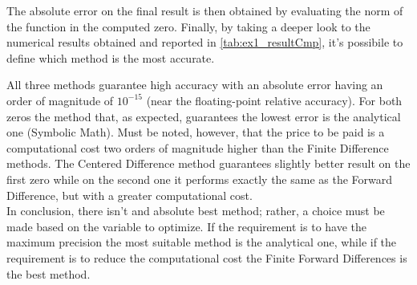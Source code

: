 \documentclass[11pt,a4paper,oneside]{article}
\begin{document}
The absolute error on the final result is then obtained by evaluating the norm of the function in the computed zero. 
Finally, by taking a deeper look to the numerical results obtained and reported in \cref{tab:ex1_resultCmp}, it's possibile to define which method is the most accurate.

\begin{table}[ht]
    \centering
    \caption{Methods compare on zeros computation}
    \label{tab:ex1_resultCmp}
    \hspace{0.05\linewidth}     %
\end{table}

All three methods guarantee high accuracy with an absolute error having an order of magnitude of $10^{-15}$ (near the floating-point relative accuracy).
For both zeros the method that, as expected, guarantees the lowest error is the analytical one (Symbolic Math).
Must be noted, however, that the price to be paid is a computational cost two orders of magnitude higher than the Finite Difference methods.
The Centered Difference method guarantees slightly better result on the first zero while on the second one it performs exactly the same as the Forward Difference, but with a greater computational cost.
\\
In conclusion, there isn't and absolute best method; rather, a choice must be made based on the variable to optimize.
If the requirement is to have the maximum precision the most suitable method is the analytical one, while if the requirement is to reduce the computational cost the Finite Forward Differences is the best method.
\end{document}
